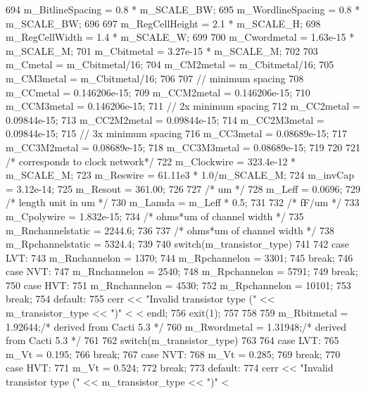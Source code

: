 \begin{DoxyCode}
{{694         m_BitlineSpacing = 0.8 * m_SCALE_BW;
695         m_WordlineSpacing = 0.8 * m_SCALE_BW;
696 
697         m_RegCellHeight = 2.1 * m_SCALE_H;
698         m_RegCellWidth = 1.4 * m_SCALE_W;
699 
700         m_Cwordmetal = 1.63e-15 * m_SCALE_M;
701         m_Cbitmetal = 3.27e-15 * m_SCALE_M;
702 
703         m_Cmetal = m_Cbitmetal/16;
704         m_CM2metal = m_Cbitmetal/16;
705         m_CM3metal = m_Cbitmetal/16;
706 
707         // minimum spacing
708         m_CCmetal = 0.146206e-15;
709         m_CCM2metal = 0.146206e-15;
710         m_CCM3metal = 0.146206e-15;
711         // 2x minimum spacing
712         m_CC2metal = 0.09844e-15;
713         m_CC2M2metal = 0.09844e-15;
714         m_CC2M3metal = 0.09844e-15;
715         // 3x minimum spacing
716         m_CC3metal = 0.08689e-15;
717         m_CC3M2metal = 0.08689e-15;
718         m_CC3M3metal = 0.08689e-15;
719 
720 
721         /* corresponds to clock network*/
722         m_Clockwire = 323.4e-12 * m_SCALE_M;
723         m_Reswire = 61.11e3 * 1.0/m_SCALE_M;
724         m_invCap = 3.12e-14;
725         m_Resout = 361.00;
726 
727         /* um */
728         m_Leff = 0.0696;
729         /* length unit in um */
730         m_Lamda = m_Leff * 0.5;
731 
732         /* fF/um */
733         m_Cpolywire = 1.832e-15;
734         /* ohms*um of channel width */
735         m_Rnchannelstatic = 2244.6;
736 
737         /* ohms*um of channel width */
738         m_Rpchannelstatic = 5324.4;
739 
740         switch(m_transistor_type)
741         {
742             case LVT:
743                 m_Rnchannelon = 1370;
744                 m_Rpchannelon = 3301;
745                 break;
746             case NVT:
747                 m_Rnchannelon = 2540;
748                 m_Rpchannelon = 5791;
749                 break;
750             case HVT:
751                 m_Rnchannelon = 4530;
752                 m_Rpchannelon = 10101;
753                 break;
754             default:
755                 cerr << "Invalid transistor type (" << m_transistor_type << ")" <
      < endl;
756                 exit(1);
757         }
758 
759         m_Rbitmetal = 1.92644;/* derived from Cacti 5.3 */  
760         m_Rwordmetal = 1.31948;/* derived from Cacti 5.3 */
761 
762         switch(m_transistor_type)
763         {
764             case LVT:
765                 m_Vt = 0.195;
766                 break;
767             case NVT:
768                 m_Vt = 0.285;
769                 break;
770             case HVT:
771                 m_Vt = 0.524;
772                 break;
773             default:
774                 cerr << "Invalid transistor type (" << m_transistor_type << ")" <
}}}
\end{DoxyCode}
